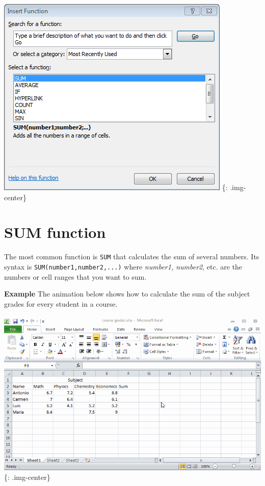\includegraphics[keepaspectratio,width=\textwidth,height=0.75\textheight]{img/dialog_insert_function.png}
\{: .img-center\}

\section{SUM function}
\label{sumfunction}

The most common function is \texttt{SUM} that calculates the sum of several numbers. Its syntax is \texttt{SUM(number1,number2,...)} where \emph{number1, number2}, etc. are the numbers or cell ranges that you want to sum. 

\textbf{Example} The animation below shows how to calculate the sum of the subject grades for every student in a course. 

\includegraphics[keepaspectratio,width=\textwidth,height=0.75\textheight]{img/example_function_sum.gif}
\{: .img-center\}

